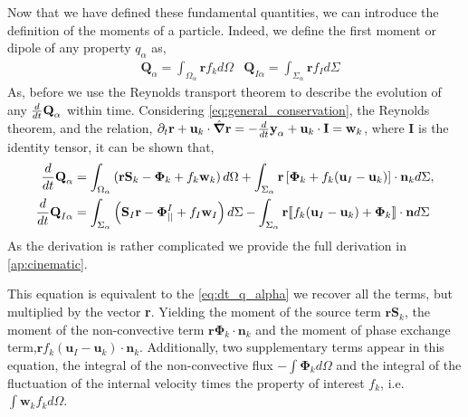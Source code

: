 Now that we have defined these fundamental quantities, we can introduce the definition of the moments of a particle.
Indeed, we define the first moment or dipole of any property $q_\alpha$ as,
\begin{align}
    &\textbf{Q}_\alpha 
    = \int_{\Omega_\alpha} \textbf{r} f_k d\Omega
    &\textbf{Q}_{I\alpha} 
    = \int_{\Sigma_\alpha} \textbf{r} f_I d\Sigma
\end{align}
As, before we use the Reynolds transport theorem to describe the evolution of any $\frac{d}{d t} \textbf{Q}_\alpha$ within time. 
Considering \ref{eq:general_conservation}, the Reynolds theorem, and the relation,
$  \partial_t \textbf{r}
+ \textbf{u}_k \cdot \hat{\bm{\nabla}} \textbf{r}
= - \frac{d}{dt} \textbf{y}_\alpha  + \textbf{u}_k \cdot \textbf{I}
= \textbf{w}_k$,
where $\textbf{I}$ is the identity tensor, it can be shown that, 
\begin{align}
    \frac{d}{d t} \textbf{Q}_\alpha
    &= \int_{\Omega_\alpha} \left( 
        \textbf{r} \textbf{S}_k 
        - \bm{\Phi}_k
        + f_k  \textbf{w}_k 
    \right) d\Omega
    + \int_{\Sigma_\alpha} \textbf{r} \left[
        \bm{\Phi}_k
        + f_k (\textbf{u}_I-\textbf{u}_k)
    \right]\cdot \textbf{n}_k  d\Sigma,
    \label{eq:dt_Q_alpha}\\
    \frac{d}{d t} \textbf{Q}_{I\alpha}
    &= \int_{\Sigma_\alpha} \left(
        \textbf{S}_I\textbf{r}
        - \mathbf{\Phi}_{||}^I
        + f_I \textbf{w}_I
    \right) d\Sigma
    - \int_{\Sigma_\alpha}\textbf{r} \llbracket 
        f_k (\textbf{u}_I - \textbf{u}_k)
        + \mathbf{\Phi}_k
     \rrbracket \cdot \textbf{n}
    d\Sigma
    \label{eq:dt_Q_I_alpha}
\end{align}
As the derivation is rather complicated we provide the full derivation in \ref{ap:cinematic}. 


This equation is equivalent to the \ref{eq:dt_q_alpha} we recover all the terms, but multiplied by the vector \textbf{r}.
Yielding the moment of the source term $\textbf{rS}_k$, the moment of the non-convective term $\textbf{r}\mathbf{\Phi}_k\cdot\textbf{n}_k$ and the moment of phase exchange term,$\textbf{r} f_k (\textbf{u}_I-\textbf{u}_k)\cdot\textbf{n}_k$. 
Additionally, two supplementary terms appear in this equation, the integral of the non-convective flux $- \int \bm{\Phi}_k d\Omega$ and the integral of the fluctuation of the internal velocity times the property of interest $f_k$, i.e. $\int \textbf{w}_k f_k d\Omega$. 
 
